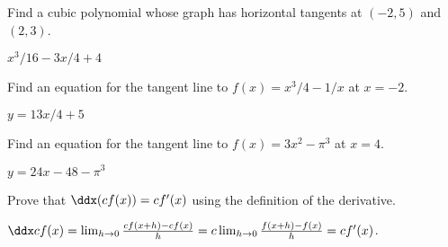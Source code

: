 \begin{exercises}

\begin{exercise} 
Find a cubic polynomial whose graph has horizontal tangents at $(-2 ,
5)$ and $(2, 3)$.
\begin{answer} $x^3/16-3x/4+4$
\end{answer}\end{exercise}

\begin{exercise}
  Find an equation for the tangent line to $f(x) = x^3/4 - 1/x$ at $x=-2$.
\begin{answer} $y=13x/4+5$
\end{answer}\end{exercise}

\begin{exercise} 
  Find an equation for the tangent line to $f(x)= 3x^2 - \pi ^3$ at
  $x= 4$.
\begin{answer} $y=24x-48-\pi^3$
\end{answer}
\end{exercise}



 
\begin{exercise} Prove that $\ddx(cf(x))= cf'(x)$ using the
definition of the derivative.
\end{exercise}
\begin{answer} 
$\ddx cf(x) = \lim_{h\to 0}\frac{cf(x+h)-cf(x)}{h} = c\lim_{h\to 0}\frac{f(x+h)-f(x)}{h} = cf'(x)$.
\end{answer}
\end{exercises}
